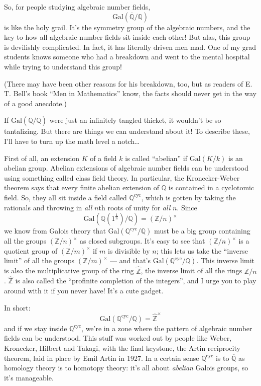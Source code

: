 \documentclass{article}
\begin{document}
So, for people studying algebraic number fields,
\[\mathrm{Gal}(\overline{\mathbb{Q}}/\mathbb{Q})\] is like the holy
grail. It's the symmetry group of the algebraic numbers, and the key to
how all algebraic number fields sit inside each other! But alas, this
group is devilishly complicated. In fact, it has literally driven men
mad. One of my grad students knows someone who had a breakdown and went
to the mental hospital while trying to understand this group!

(There may have been other reasons for his breakdown, too, but as
readers of E. T. Bell's book ``Men in Mathematics'' know, the facts
should never get in the way of a good anecdote.)

If \(\mathrm{Gal}(\overline{\mathbb{Q}}/\mathbb{Q})\) were just an
infinitely tangled thicket, it wouldn't be so tantalizing. But there are
things we can understand about it! To describe these, I'll have to turn
up the math level a notch\ldots{}

First of all, an extension \(K\) of a field \(k\) is called ``abelian''
if \(\mathrm{Gal}(K/k)\) is an abelian group. Abelian extensions of
algebraic number fields can be understood using something called class
field theory. In particular, the Kronecker-Weber theorem says that every
finite abelian extension of \(\mathbb{Q}\) is contained in a cyclotomic
field. So, they all sit inside a field called
\(\mathbb{Q}^{\mathrm{cyc}}\), which is gotten by taking the rationals
and throwing in \emph{all} \(n\)th roots of unity for \emph{all} \(n\).
Since
\[\mathrm{Gal}(\mathbb{Q}(1^{\frac1n})/\mathbb{Q}) = (\mathbb{Z}/n)^\times\]
we know from Galois theory that
\(\mathrm{Gal}(\mathbb{Q}^{\mathrm{cyc}}/\mathbb{Q})\) must be a big
group containing all the groups \((\mathbb{Z}/n)^\times\) as closed
subgroups. It's easy to see that \((\mathbb{Z}/n)^\times\) is a quotient
group of \((\mathbb{Z}/m)^\times\) if \(m\) is divisible by \(n\); this
lets us take the ``inverse limit'' of all the groups
\((\mathbb{Z}/m)^\times\) --- and that's
\(\mathrm{Gal}(\mathbb{Q}^{\mathrm{cyc}}/\mathbb{Q})\). This inverse
limit is also the multiplicative group of the ring
\(\widehat{\mathbb{Z}}\), the inverse limit of all the rings
\(\mathbb{Z}/n\). \(\widehat{\mathbb{Z}}\) is also called the
``profinite completion of the integers'', and I urge you to play around
with it if you never have! It's a cute gadget.

In short:
\[\mathrm{Gal}(\mathbb{Q}^{\mathrm{cyc}}/\mathbb{Q}) = \widehat{\mathbb{Z}}^\times\]
and if we stay inside \(\mathbb{Q}^{\mathrm{cyc}}\), we're in a zone
where the pattern of algebraic number fields can be understood. This
stuff was worked out by people like Weber, Kronecker, Hilbert and
Takagi, with the final keystone, the Artin reciprocity theorem, laid in
place by Emil Artin in 1927. In a certain sense
\(\mathbb{Q}^{\mathrm{cyc}}\) is to \(\overline{\mathbb{Q}}\) as
homology theory is to homotopy theory: it's all about \emph{abelian}
Galois groups, so it's manageable.
\end{document}

